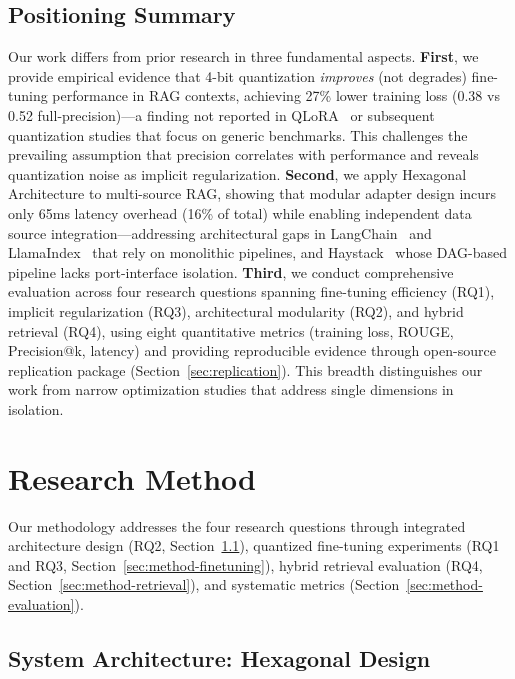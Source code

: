 \documentclass[pdflatex,sn-basic]{sn-jnl}
\begin{document}
\subsection{Positioning Summary}
\label{sec:related-positioning}

Our work differs from prior research in three fundamental aspects. \textbf{First}, we provide empirical evidence that 4-bit quantization \textit{improves} (not degrades) fine-tuning performance in RAG contexts, achieving 27\% lower training loss (0.38 vs 0.52 full-precision)—a finding not reported in QLoRA~\citep{dettmers2023qlora} or subsequent quantization studies that focus on generic benchmarks. This challenges the prevailing assumption that precision correlates with performance and reveals quantization noise as implicit regularization. \textbf{Second}, we apply Hexagonal Architecture to multi-source RAG, showing that modular adapter design incurs only 65ms latency overhead (16\% of total) while enabling independent data source integration—addressing architectural gaps in LangChain~\citep{langchain2023} and LlamaIndex~\citep{llamaindex2023} that rely on monolithic pipelines, and Haystack~\citep{haystack2023} whose DAG-based pipeline lacks port-interface isolation. \textbf{Third}, we conduct comprehensive evaluation across four research questions spanning fine-tuning efficiency (RQ1), implicit regularization (RQ3), architectural modularity (RQ2), and hybrid retrieval (RQ4), using eight quantitative metrics (training loss, ROUGE, Precision@k, latency) and providing reproducible evidence through open-source replication package (Section~\ref{sec:replication}). This breadth distinguishes our work from narrow optimization studies that address single dimensions in isolation.


\section{Research Method}
\label{sec:method}

Our methodology addresses the four research questions through integrated architecture design (RQ2, Section~\ref{sec:method-architecture}), quantized fine-tuning experiments (RQ1 and RQ3, Section~\ref{sec:method-finetuning}), hybrid retrieval evaluation (RQ4, Section~\ref{sec:method-retrieval}), and systematic metrics (Section~\ref{sec:method-evaluation}).

\subsection{System Architecture: Hexagonal Design}
\label{sec:method-architecture}
\end{document}
